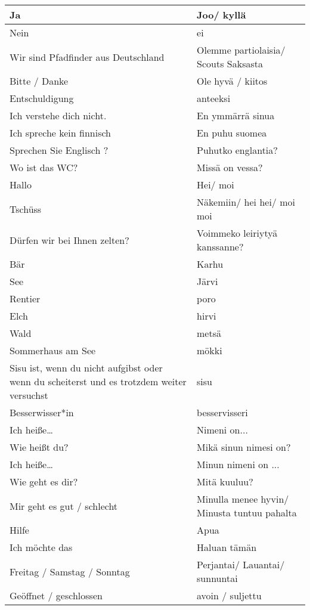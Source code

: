 \begin{table}[h!]
	\centering
	\small
	\begin{tabular}{m{6cm}m{6cm}}
	\hline
	Ja & Joo/ kyllä \\ \hline
	Nein & ei \\ \hline
	Wir sind Pfadfinder aus Deutschland & Olemme partiolaisia/ Scouts Saksasta \\ \hline
	Bitte / Danke & Ole hyvä / kiitos \\ \hline
	Entschuldigung & anteeksi \\ \hline
	Ich verstehe dich nicht. & En ymmärrä sinua \\ \hline
	Ich spreche kein finnisch & En puhu suomea \\ \hline
	Sprechen Sie Englisch ? & Puhutko englantia? \\ \hline
	Wo ist das WC? & Missä on vessa? \\ \hline
	Hallo & Hei/ moi \\ \hline
	Tschüss & Näkemiin/ hei hei/ moi moi \\ \hline
	Dürfen wir bei Ihnen zelten? & Voimmeko leiriytyä kanssanne? \\ \hline
	Bär & Karhu \\ \hline
	See & Järvi \\ \hline
	Rentier & poro \\ \hline
	Elch & hirvi \\ \hline
	Wald & metsä \\ \hline
	Sommerhaus am See & mökki \\ \hline
	Sisu ist, wenn du nicht aufgibst oder wenn du scheiterst und es trotzdem weiter versuchst & sisu \\ \hline
	Besserwisser*in & besservisseri \\ \hline
	Ich heiße… & Nimeni on... \\ \hline
	Wie heißt du? & Mikä sinun nimesi on? \\ \hline
	Ich heiße… & Minun nimeni on ... \\ \hline
	Wie geht es dir? & Mitä kuuluu? \\ \hline
	Mir geht es gut / schlecht & Minulla menee hyvin/ Minusta tuntuu pahalta \\ \hline
	Hilfe & Apua \\ \hline
	Ich möchte das & Haluan tämän \\ \hline
	Freitag / Samstag / Sonntag & Perjantai/ Lauantai/ sunnuntai \\ \hline
	Geöffnet / geschlossen & avoin / suljettu \\ \hline
\end{tabular}
\end{table}
	